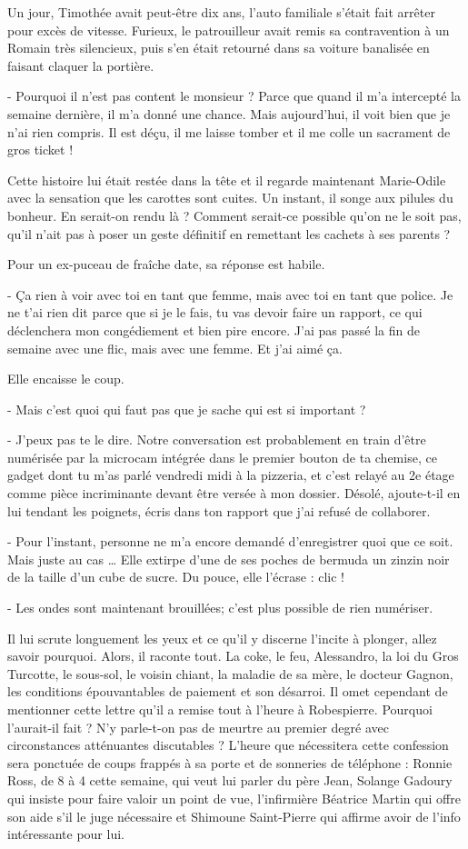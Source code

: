 Un jour, Timothée avait peut-être dix ans, l’auto familiale s’était fait arrêter pour excès de vitesse. Furieux, le patrouilleur avait remis sa contravention à un Romain très silencieux, puis s’en était retourné dans sa voiture banalisée en faisant claquer la portière.

- Pourquoi il n’est pas content le monsieur ? Parce que quand il m’a intercepté la semaine dernière, il m’a donné une chance. Mais aujourd’hui, il voit bien que je n’ai rien compris. Il est déçu, il me laisse tomber et il me colle un sacrament de gros ticket !

Cette histoire lui était restée dans la tête et il regarde maintenant Marie-Odile avec la sensation que les carottes sont cuites. Un instant, il songe aux pilules du bonheur. En serait-on rendu là ? Comment serait-ce possible qu’on ne le soit pas, qu’il n’ait pas à poser un geste définitif en remettant les cachets à ses parents ?

Pour un ex-puceau de fraîche date, sa réponse est habile.

- Ça rien à voir avec toi en tant que femme, mais avec toi en tant que police. Je ne t’ai rien dit parce que si je le fais, tu vas devoir faire un rapport, ce qui déclenchera mon congédiement et bien pire encore. J’ai pas passé la fin de semaine avec une flic, mais avec une femme. Et j’ai aimé ça.

Elle encaisse le coup.

- Mais c’est quoi qui faut pas que je sache qui est si important ?

- J’peux pas te le dire. Notre conversation est probablement en train d’être numérisée par la microcam intégrée dans le premier bouton de ta chemise, ce gadget dont tu m’as parlé vendredi midi à la pizzeria, et c’est relayé au 2e étage comme pièce incriminante devant être versée à mon dossier. Désolé, ajoute-t-il en lui tendant les poignets, écris dans ton rapport que j’ai refusé de collaborer.

- Pour l’instant, personne ne m’a encore demandé d’enregistrer quoi que ce soit. Mais juste au cas …
Elle extirpe d’une de ses poches de bermuda un zinzin noir de la taille d’un cube de sucre. Du pouce, elle l’écrase : clic !

- Les ondes sont maintenant brouillées; c’est plus possible de rien numériser.

Il lui scrute longuement les yeux et ce qu’il y discerne l’incite à plonger, allez savoir pourquoi. Alors, il raconte tout. La coke, le feu, Alessandro, la loi du Gros Turcotte, le sous-sol, le voisin chiant, la maladie de sa mère, le docteur Gagnon, les conditions épouvantables de paiement et son désarroi. Il omet cependant de mentionner cette lettre qu’il a remise tout à l’heure à Robespierre. Pourquoi l’aurait-il fait ? N’y parle-t-on pas de meurtre au premier degré avec circonstances atténuantes discutables ? L’heure que nécessitera cette confession sera ponctuée de coups frappés à sa porte et de sonneries de téléphone : Ronnie Ross, de 8 à 4 cette semaine, qui veut lui parler du père Jean, Solange Gadoury qui insiste pour faire valoir un point de vue, l’infirmière Béatrice Martin qui offre son aide s’il le juge nécessaire et Shimoune Saint-Pierre qui affirme avoir de l’info intéressante pour lui.

